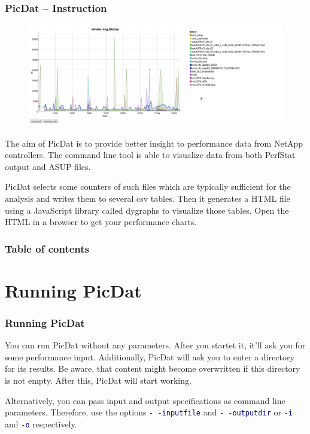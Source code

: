 \documentclass[8pt]{beamer}
\begin{document}
\begin{frame}
\frametitle{PicDat -- Instruction}
\begin{figure}
	\includegraphics[width=\textwidth]{../images/PicDat_normal.png}
\end{figure}
The aim of PicDat is to provide better insight to performance data from NetApp controllers. The command line tool is able to visualize data from both PerfStat output and ASUP files.

PicDat selects some counters of such files which are typically sufficient for the analysis and writes them to several csv tables. Then it generates a HTML file using a JavaScript library called dygraphs to visualize those tables. Open the HTML in a browser to get your performance charts.
\end{frame}

\begin{frame}
\frametitle{Table of contents}

\tableofcontents
\end{frame}

\section{Running PicDat}
\begin{frame}
\frametitle{Running PicDat}
You can run PicDat without any parameters. After you startet it, it'll ask you for some performance input. Additionally, PicDat will ask you to enter a directory for its results. Be aware, that content might become overwritten if this directory is not empty. After this, PicDat will start working. 
\bigskip

Alternatively, you can pass input and output specifications as command line parameters. Therefore, use the options \textcolor{darkblue}{\texttt{-\,-inputfile}} and \textcolor{darkblue}{\texttt{-\,-outputdir}} or \textcolor{darkblue}{\texttt{-i}} and \textcolor{darkblue}{\texttt{-o}} respectively.
\smallskip
\end{frame}
\end{document}

